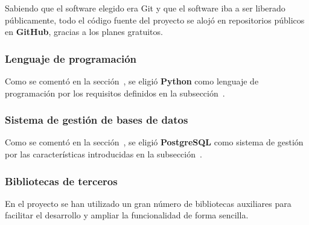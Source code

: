 Sabiendo que el software elegido era Git y que el software iba a ser liberado
públicamente, todo el código fuente del proyecto se alojó en repositorios
públicos en \textbf{GitHub},\cite{github} gracias a los planes gratuitos.


\subsubsection{Lenguaje de programación}

Como se comentó en la sección~, se eligió
\textbf{Python} como lenguaje de programación por los requisitos definidos
en la subsección~.

\subsubsection{Sistema de gestión de bases de datos}

Como se comentó en la sección~, se eligió
\textbf{PostgreSQL} como sistema de gestión por las características introducidas
en la subsección~.

\subsubsection{Bibliotecas de terceros}

En el proyecto se han utilizado un gran número de bibliotecas auxiliares para
facilitar el desarrollo y ampliar la funcionalidad de forma sencilla.

